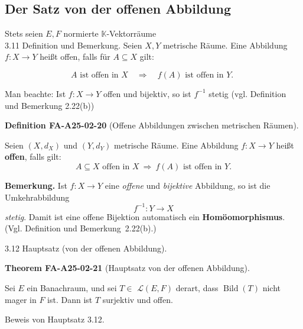 \documentclass[10pt, letterpaper]{article}
\newcommand{\CustomHeading}[3]{%
  \par\medskip\noindent%
  \textbf{#1 #2} \textnormal{(#3)}.\enskip%
}
\newenvironment{DEF}[2]{\begin{unitbox}\CustomHeading{Definition}{#1}{#2}}{\end{unitbox}}
\newenvironment{THEO}[2]{\begin{unitbox}\CustomHeading{Theorem}{#1}{#2}}{\end{unitbox}}
\begin{document}
\pagebreak


\subsection{Der Satz von der offenen Abbildung}
Stets seien $E, F$ normierte $\mathbb{K}$-Vektorräume\\


3.11 Definition und Bemerkung. Seien $X, Y$ metrische Räume. Eine Abbildung $f: X \rightarrow Y$ heißt offen, falls für $A \subseteq X$ gilt:

$$
A \text { ist offen in } X \quad \Longrightarrow \quad f(A) \text { ist offen in } Y \text {. }
$$

Man beachte: Ist $f: X \rightarrow Y$ offen und bijektiv, so ist $f^{-1}$ stetig (vgl. Definition und Bemerkung 2.22(b))\\



\begin{DEF}{FA-A25-02-20}{Offene Abbildungen zwischen metrischen Räumen}
Seien $(X,d_X)$ und $(Y,d_Y)$ metrische Räume.  
Eine Abbildung $f:X\to Y$ heißt \textbf{offen}, falls gilt:
\[
A\subseteq X \text{ offen in } X \ \Longrightarrow\ f(A)\text{ ist offen in } Y.
\]

\textbf{Bemerkung.}  
Ist $f:X\to Y$ eine \emph{offene} und \emph{bijektive} Abbildung, so ist die Umkehrabbildung
\[
f^{-1}:Y\to X
\]
\emph{stetig}.  
Damit ist eine offene Bijektion automatisch ein \textbf{Homöomorphismus}.
(Vgl. Definition und Bemerkung~2.22(b).)
\end{DEF}






3.12 Hauptsatz (von der offenen Abbildung). 

\begin{THEO}{FA-A25-02-21}{Hauptsatz von der offenen Abbildung}
Sei $E$ ein Banachraum, und sei $T \in$ $\mathcal{L}(E, F)$ derart, dass $\operatorname{Bild}(T)$ nicht mager in $F$ ist. Dann ist $T$ surjektiv und offen.
\end{THEO}


Beweis von Hauptsatz 3.12. 
\end{document}
